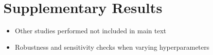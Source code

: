 \chapter{Supplementary Results}
\begin{itemize}
    \item Other studies performed not included in main text
    \item Robustness and sensitivity checks when varying hyperparameters
\end{itemize}